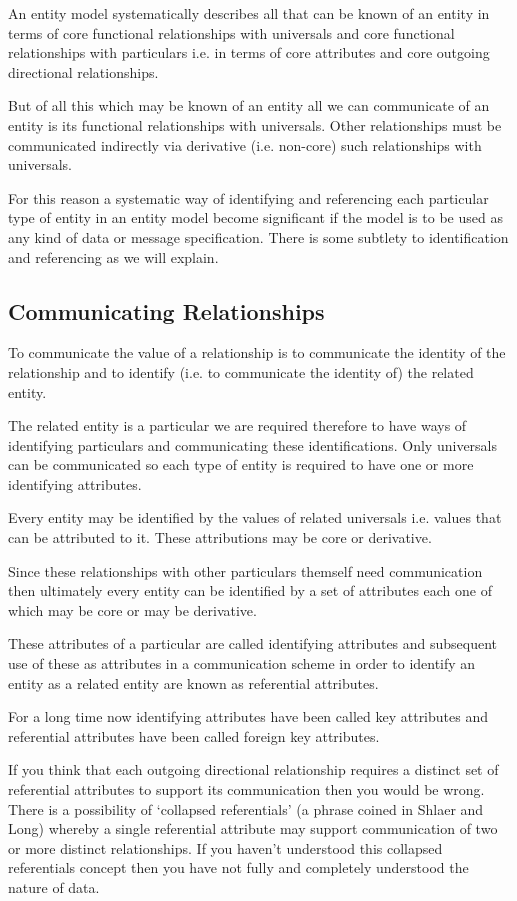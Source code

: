 \mynote An entity model systematically describes all that can be known of an entity
in terms of core functional relationships with universals and core functional relationships with particulars i.e. in terms of core attributes and core outgoing directional relationships.

\mynote But of all this which  may be known of an entity all we can communicate of an entity is its functional relationships with universals. Other relationships must be communicated indirectly via derivative (i.e. non-core) such relationships with universals. 

\mynote For this reason a systematic way of identifying and referencing each particular type  of entity in an entity model become significant if the model is to be used as any kind of data or message specification. There is some subtlety to identification and referencing as we will explain.

\subsection*{Communicating Relationships}
\mynote To communicate the value of a relationship is to communicate the identity of the relationship and to identify (i.e. to communicate the identity of) the related entity. 

\mynote The related entity is a particular we are required therefore to have ways of identifying particulars and communicating these identifications.  
Only universals can be communicated so each type of entity is required 
to have one or more identifying attributes. 

\mynote Every entity may be identified by the values of related universals i.e. values that can be attributed to it. These attributions  may be core or derivative.

\mynote Since these relationships with other particulars themself need communication then ultimately every entity can be identified by a set of attributes each one of which may be core or may be derivative.  

\mynote
These attributes of a particular are called identifying attributes and subsequent use of these as attributes in a communication scheme in order to identify an entity as a related entity are known as referential attributes. 

\mynote For a long time now identifying attributes have been called key attributes and referential attributes have been called foreign key attributes. 

\mynote If you think that each outgoing directional relationship requires a distinct set of referential attributes to support its communication then you would be wrong. 
There is a possibility of `collapsed referentials' (a phrase coined in Shlaer and Long) whereby a single referential attribute may support communication of two or more distinct relationships. If you haven't understood this collapsed referentials concept then you have not  fully and completely understood the nature of data. 

